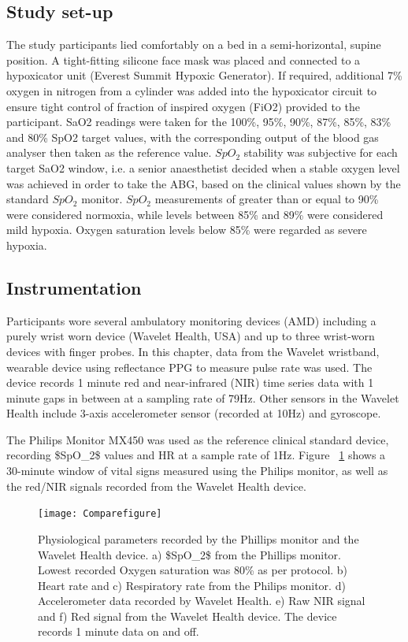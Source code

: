 \subsection{Study set-up}

The study participants lied comfortably on a bed  in a semi-horizontal, supine position. A tight-fitting silicone face mask was placed and connected to a hypoxicator unit (Everest Summit Hypoxic Generator). If required, additional 7\% oxygen in nitrogen from a cylinder was added into the hypoxicator circuit to ensure tight control of fraction of inspired oxygen (FiO2) provided to the participant. SaO2 readings were taken for the 100\%, 95\%, 90\%, 87\%, 85\%, 83\% and 80\% SpO2 target values, with the corresponding output of the blood gas analyser then taken as the reference value. 
$SpO_2$ stability was subjective for each target SaO2 window, i.e. a senior
anaesthetist decided when a stable oxygen level was achieved in order to take the ABG, based on the clinical values shown by the standard $SpO_2$ monitor. $SpO_2$ measurements of greater than or equal to 90\% were considered normoxia, while levels between 85\% and 89\% were considered mild hypoxia. Oxygen saturation levels below 85\% were regarded as severe hypoxia.

\subsection{Instrumentation}

Participants wore several ambulatory monitoring devices (AMD) including a purely wrist worn device (Wavelet Health, USA) and up to three wrist-worn devices with finger probes. In this chapter, data from the Wavelet wristband, wearable device using reflectance PPG to measure pulse rate was used. The device records 1 minute red and near-infrared (NIR) time series data with 1 minute gaps in between at a sampling rate of 79Hz. Other sensors in the Wavelet Health include 3-axis accelerometer sensor (recorded at 10Hz) and gyroscope.

The Philips Monitor MX450 was used as the reference clinical standard device, recording \gls{$SpO_2$} values and HR at a sample rate of 1Hz. Figure ~\ref{physio} shows a 30-minute window of vital signs measured using the Philips monitor, as well as the red/NIR signals recorded from the Wavelet Health device. 

\begin{figure}[!ht]
	\centering
	 \texttt{[image: Comparefigure]}
	    \caption[Reference physiological parameters recorded by the Phillips monitor and the Wavelet Health device.]
	    {
	    Physiological parameters recorded by the Phillips monitor and the Wavelet Health device. 
	    a) \gls{$SpO_2$} from the Phillips monitor. Lowest recorded Oxygen saturation was 80\% as per protocol. b) Heart rate and c) Respiratory rate from the Philips monitor. d) Accelerometer data recorded by Wavelet Health. e) Raw NIR signal and f) Red signal from the Wavelet Health device. The device records 1 minute data on and off.
	    }      
	 \label{physio}  
\end{figure}


